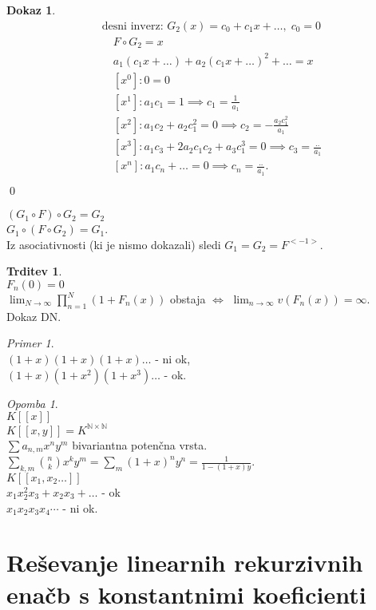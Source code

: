 \documentclass[a4paper, 12pt]{book}
\theoremstyle{definition}
\newtheorem{claim}[counter]{Trditev}
\newtheorem{pro}[counter]{Dokaz}
\theoremstyle{remark}
\newtheorem*{ex}{Primer}
\newtheorem*{rem}{Opomba}
\newcommand{\N}{\mathbb{N}}
\begin{document}
\begin{pro}
\begin{align*}
    &\text{desni inverz: } G_2(x) = c_0 + c_1 x + \dots, \; c_0 = 0 \\
    &\quad F \circ G_2 = x \\
    &\quad a_1 (c_1 x + \dots) + a_2 (c_1 x + \dots)^2 + \dots = x \\
    &\quad [x^0]: 0 = 0 \\
    &\quad [x^1]: a_1 c_1 = 1 \implies c_1 = \frac{1}{a_1} \\
    &\quad [x^2]: a_1 c_2 + a_2 c_1^2 = 0 \implies c_2 = -\frac{a_2 c_1^2}{a_1} \\
    &\quad [x^3]: a_1 c_3 + 2 a_2 c_1 c_2 + a_3 c_1^3 = 0 \implies c_3 = \frac{..}{a_1} \\
    &\quad [x^n]: a_1 c_n + \dots = 0 \implies c_n = \frac{..}{a_1}. \\
  \end{align*}
  \qed
\end{pro}
$(G_1 \circ F) \circ G_2 = G_2$ \\
$G_1 \circ (F \circ G_2) = G_1$. \\
Iz asociativnosti (ki je nismo dokazali) sledi $G_1 = G_2 = F^{<-1>}$.
\begin{claim} \text{} \\
  $F_n(0) = 0$ \\
  $\lim_{N \to \infty} \prod_{n=1}^{N} (1 + F_n(x))$ obstaja $\iff$ $\lim_{n \to \infty} v(F_n(x)) = \infty$. \\
  Dokaz DN.
\end{claim}
\begin{ex} \text{} \\
  $(1+x) (1+x) (1+x) \dots$ - ni ok, \\
  $(1+x) (1+x^2) (1+x^3) \dots$ - ok.
\end{ex}
\begin{rem} \text{} \\
  $K[[x]]$ \\
  $K[[x,y]] = K^{\N \times \N}$ \\
  $\sum a_{n,m} x^n y^m$ bivariantna potenčna vrsta. \\
  $\sum_{k,m} \binom{n}{k} x^k y^m = \sum_m (1+x)^n y^n = \frac{1}{1-(1+x)y}$. \\
  $K[[x_1, x_2 \dots]]$ \\
  $x_1 x_2^2 x_3 + x_2 x_3 + \dots$ - ok \\
  $x_1 x_2 x_3 x_4 \cdots$ - ni ok.
\end{rem}


\section{Reševanje linearnih rekurzivnih enačb s konstantnimi koeficienti}
\end{document}

